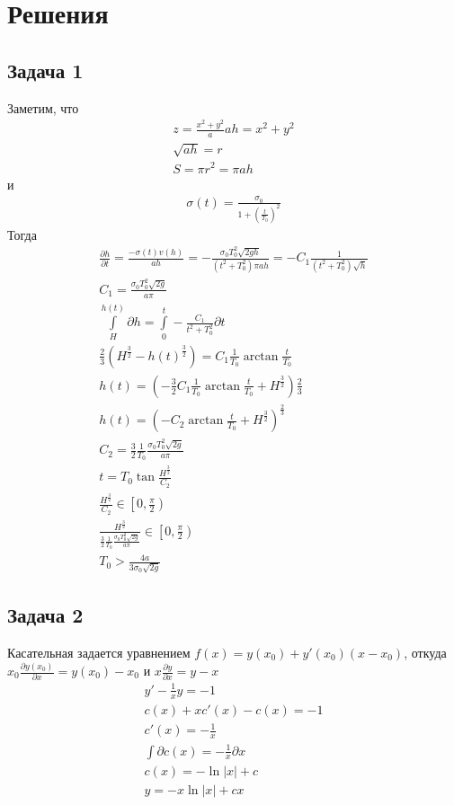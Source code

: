 

\newpage
\section*{Решения}
\subsection*{Задача 1}
Заметим, что
\begin{gather*}
	z = \frac{x^2 + y^2}{a}
	ah = x^2 + y^2\\
	\sqrt{ah} = r\\
	S = \pi r^2 = \pi ah
\end{gather*}
и
\begin{gather*}
	\sigma(t) = \frac{\sigma_0}{1 + \left(\frac{t}{T_0}\right)^2}
\end{gather*}
Тогда
\begin{gather*}
	\frac{\partial h}{\partial t} = \frac{- \sigma(t) v(h)}{ah} = - \frac{\sigma_0 T_0^2 \sqrt{2gh}}{(t^2 + T_0^2) \pi ah} = -C_1 \frac{1}{(t^2 + T_0^2)\sqrt{h}}\\
	C_1 = \frac{\sigma_0 T_0^2 \sqrt{2g}}{a \pi}\\
	\int\limits_{H}^{h(t)} \partial h = \int\limits_{0}^{t} -\frac{C_1}{t^2 + T_0^2} \partial t\\
	\frac{2}{3}(H^{\frac{3}{2}} - h(t)^{\frac{3}{2}}) = C_1 \frac{1}{T_0} \arctan \frac{t}{T_0}\\
	h(t) = (-\frac{3}{2} C_1 \frac{1}{T_0} \arctan \frac{t}{T_0} + H^{\frac{3}{2}})\frac{2}{3}\\
	h(t) = (-C_2 \arctan \frac{t}{T_0} + H^{\frac{3}{2}})^{\frac{2}{3}}\\
	C_2 = \frac{3}{2}\frac{1}{T_0}\frac{\sigma_0 T_0^2 \sqrt{2g}}{a \pi}\\
	t = T_0 \tan \frac{H^{\frac{3}{2}}}{C_2}\\
	\frac{H^{\frac{3}{2}}}{C_2} \in \left[0, \frac{\pi}{2}\right)\\
	\frac{H^{\frac{3}{2}}}{\frac{3}{2}\frac{1}{T_0}\frac{\sigma_0 T_0^2 \sqrt{2g}}{a \pi}} \in \left[0, \frac{\pi}{2}\right)\\
	T_0 > \frac{4a}{3 \sigma_0 \sqrt{2g}}
\end{gather*}

\subsection*{Задача 2}
Касательная задается уравнением $f(x) = y(x_0) + y'(x_0)(x - x_0)$, откуда $x_0 \frac{\partial y(x_0)}{\partial x} = y(x_0) - x_0$ и $x \frac{\partial y}{\partial x} = y - x$
\begin{gather*}
	y' - \frac{1}{x} y = -1\\
	c(x) + x c'(x) - c(x) = -1\\
	c'(x) = -\frac{1}{x}\\
	\int \partial c(x) = -\frac{1}{x} \partial x\\
	c(x) = -\ln|x| + c\\
	y = -x \ln|x| + cx
\end{gather*}

